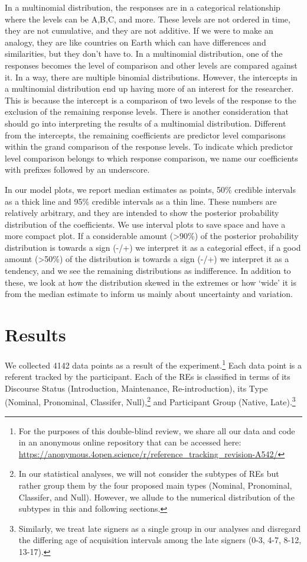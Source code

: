 \documentclass[]{elsarticle} %
\begin{document}
In a multinomial distribution, the responses are in a categorical
relationship where the levels can be A,B,C, and more. These levels are
not ordered in time, they are not cumulative, and they are not additive.
If we were to make an analogy, they are like countries on Earth which
can have differences and similarities, but they don't have to. In a
multinomial distribution, one of the responses becomes the level of
comparison and other levels are compared against it. In a way, there are
multiple binomial distributions. However, the intercepts in a
multinomial distribution end up having more of an interest for the
researcher. This is because the intercept is a comparison of two levels
of the response to the exclusion of the remaining response levels. There
is another consideration that should go into interpreting the results of
a multinomial distribution. Different from the intercepts, the remaining
coefficients are predictor level comparisons within the grand comparison
of the response levels. To indicate which predictor level comparison
belongs to which response comparison, we name our coefficients with
prefixes followed by an underscore.

In our model plots, we report median estimates as points, 50\% credible
intervals as a thick line and 95\% credible intervals as a thin line.
These numbers are relatively arbitrary, and they are intended to show
the posterior probability distribution of the coefficients. We use
interval plots to save space and have a more compact plot. If a
considerable amount (\textgreater90\%) of the posterior probability
distribution is towards a sign (-/+) we interpret it as a categorial
effect, if a good amount (\textgreater50\%) of the distribution is
towards a sign (-/+) we interpret it as a tendency, and we see the
remaining distributions as indifference. In addition to these, we look
at how the distribution skewed in the extremes or how `wide' it is from
the median estimate to inform us mainly about uncertainty and variation.

\hypertarget{results}{%
\section{Results}\label{results}}

We collected 4142 data points as a result of the
experiment.\footnote{For the purposes of this double-blind review, we share all our data and code in an anonymous online repository that can be accessed here: \url{https://anonymous.4open.science/r/reference_tracking_revision-A542/}}
Each data point is a referent tracked by the participant. Each of the
REs is classified in terms of its Discourse Status (Introduction,
Maintenance, Re-introduction), its Type (Nominal, Pronominal, Classifer,
Null),\footnote{In our statistical analyses, we will not consider the subtypes of REs but rather group them by the four proposed main types (Nominal, Pronominal, Classifer, and Null). However, we allude to the numerical distribution of the subtypes in this and following sections.}
and Participant Group (Native,
Late).\footnote{Similarly, we treat late signers as a single group in our analyses and disregard the differing age of acquisition intervals among the late signers (0-3, 4-7, 8-12, 13-17).}
\end{document}
